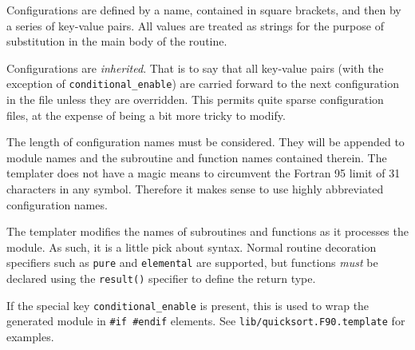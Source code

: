 \documentclass[a4paper,notitlepage]{scrreprt}
\let\code\lstinline
\begin{document}
	Configurations are defined by a name, contained in square brackets, and
	then by a series of key-value pairs. All values are treated as strings for
	the purpose of substitution in the main body of the routine.

	Configurations are \emph{inherited}. That is to say that all key-value
	pairs (with the exception of \code{conditional_enable}) are carried
	forward to the next configuration in the file unless they are overridden.
	This permits quite sparse configuration files, at the expense of being
	a bit more tricky to modify.

	The length of configuration names must be considered. They will be appended
	to module names and the subroutine and function names contained therein.
	The templater does not have a magic means to circumvent the Fortran 95
	limit of 31 characters in any symbol. Therefore it makes sense to use
	highly abbreviated configuration names.

	The templater modifies the names of subroutines and functions as it
	processes the module. As such, it is a little pick about syntax. Normal
	routine decoration specifiers such as \code{pure} and
	\code{elemental} are supported, but functions \emph{must} be declared
	using the \code{result()} specifier to define the return type.

	If the special key \code{conditional_enable} is present, this is used
	to wrap the generated module in \code{#if #endif} elements. See
	\code{lib/quicksort.F90.template} for examples.
\end{document}
